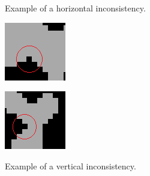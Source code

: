 \begin{figure}[h]
  \centering
  \begin{minipage}[b]{0.4\textwidth}
    \caption{Example of a horizontal inconsistency.}
    \includegraphics[width=\textwidth]{images/development/horizontal_incosistency.png}
    \label{fig:hor_inc}
  \end{minipage}
  \hfill
  \begin{minipage}[b]{0.4\textwidth}
    \caption{Example of a vertical inconsistency.}
    \includegraphics[width=\textwidth]{images/development/vertical_incosistency.png}
    \label{fig:ver_inc}
  \end{minipage}
\end{figure}

